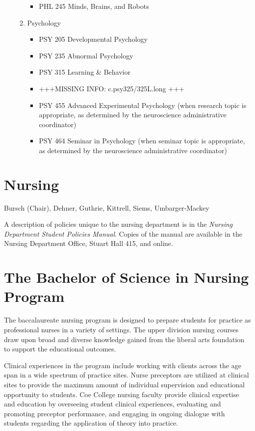 \documentclass[
  letterpaper,
]{scrbook}
\providecommand{\tightlist}{%
  \setlength{\itemsep}{0pt}\setlength{\parskip}{0pt}}
\begin{document}
\begin{enumerate}
\begin{enumerate}
    \begin{itemize}
    \tightlist
    \item
      PHL 245 Minds, Brains, and Robots
    \end{itemize}
  \item
    Psychology

    \begin{itemize}
    \tightlist
    \item
      PSY 205 Developmental Psychology
    \item
      PSY 235 Abnormal Psychology
    \item
      PSY 315 Learning \& Behavior
    \item
      +++MISSING INFO: c.psy325/325L.long +++
    \item
      PSY 455 Advanced Experimental Psychology (when research topic is
      appropriate, as determined by the neuroscience administrative
      coordinator)
    \item
      PSY 464 Seminar in Psychology (when seminar topic is appropriate,
      as determined by the neuroscience administrative coordinator)
    \end{itemize}
  \end{enumerate}
\end{enumerate}

\section{Nursing}\label{nursing}

Bursch (Chair), Dehner, Guthrie, Kittrell, Siems, Umbarger-Mackey

A description of policies unique to the nursing department is in the
\emph{Nursing Department Student Policies Manual}. Copies of the manual
are available in the Nursing Department Office, Stuart Hall 415, and
online.

\section{The Bachelor of Science in Nursing
Program}\label{the-bachelor-of-science-in-nursing-program}

The baccalaureate nursing program is designed to prepare students for
practice as professional nurses in a variety of settings. The upper
division nursing courses draw upon broad and diverse knowledge gained
from the liberal arts foundation to support the educational outcomes.

Clinical experiences in the program include working with clients across
the age span in a wide spectrum of practice sites. Nurse preceptors are
utilized at clinical sites to provide the maximum amount of individual
supervision and educational opportunity to students. Coe College nursing
faculty provide clinical expertise and education by overseeing student
clinical experiences, evaluating and promoting preceptor performance,
and engaging in ongoing dialogue with students regarding the application
of theory into practice.
\end{document}
